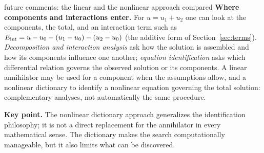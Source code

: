 \begin{explained}{future comments: the linear and the nonlinear approach compared}
\medskip\textbf{Where components and interactions enter.} For $u=u_1+u_2$ one can look at the components, the total, and an interaction term such as $E_{\mathrm{int}}=u-u_0-(u_1-u_0)-(u_2-u_0)$ (the additive form of Section~\ref{sec:terms}). \emph{Decomposition and interaction analysis} ask how the solution is assembled and how its components influence one another; \emph{equation identification} asks which differential relation governs the observed solution or its components. A linear annihilator may be used for a component when the assumptions allow, and a nonlinear dictionary to identify a nonlinear equation governing the total solution: complementary analyses, not automatically the same procedure.

\medskip\textbf{Key point.} The nonlinear dictionary approach generalizes the identification philosophy; it is not a direct replacement for the annihilator in every mathematical sense. The dictionary makes the search computationally manageable, but it also limits what can be discovered.
\end{explained}

